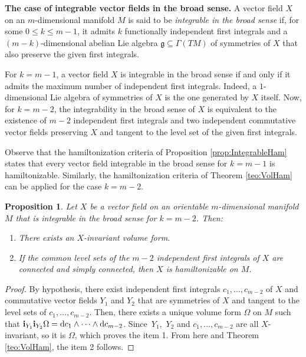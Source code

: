 \documentclass[pdftex]{sigma}%
\newcommand{\dd}{{\rm d}}
\newcommand{\ii}{\mathbf{i}}
\numberwithin{equation}{section}
\newtheorem{Proposition}[Theorem]{Proposition}
 { \theoremstyle{definition}
\newtheorem{Definition}[Theorem]{Definition}
\newtheorem{Note}[Theorem]{Note}
\newtheorem{Example}[Theorem]{Example}
\newtheorem{Remark}[Theorem]{Remark} }
\begin{document}
{\bf The case of integrable vector fields in the broad sense.} A vector field $X$ on an $m$-dimensional manifold $M$ is said to be \emph{integrable in the broad sense} \cite[Definition 1]{Bog98} if, for some $0\leq k\leq m-1$, it admits $k$ functionally independent first integrals and a $(m-k)$-dimensional abelian Lie algebra $\mathfrak{g} \subseteq \Gamma(TM)$ of symmetries of $X$ that also preserve the given first integrals.

For $k=m-1$, a vector field $X$ is integrable in the broad sense if and only if it admits the maximum number of independent first integrals. Indeed, a $1$-dimensional Lie algebra of symmetries of $X$ is the one generated by $X$ itself. Now, for $k=m-2$, the integrability in the broad sense of $X$ is equivalent to the existence of $m-2$ independent first integrals and two independent commutative vector fields preserving $X$ and tangent to the level set of the given first integrals.

Observe that the hamiltonization criteria of Proposition \ref{prop:IntegrableHam} states that every vector field integrable in the broad sense for $k=m-1$ is hamiltonizable. Similarly, the hamiltonization criteria of Theorem \ref{teo:VolHam} can be applied for the case $k=m-2$.

\begin{Proposition}
Let $X$ be a vector field on an orientable $m$-dimensional manifold $M$ that is integrable in the broad sense for $k=m-2$. Then:
 \begin{enumerate}\itemsep=0pt
 \item[$1.$] There exists an $X$-invariant volume form.
 \item[$2.$] If the common level sets of the $m-2$ independent first integrals of $X$ are connected and simply connected, then $X$ is hamiltonizable on $M$.
 \end{enumerate}
\end{Proposition}
{\sloppy\begin{proof}
By hypothesis, there exist independent first integrals $c_1,\dots,c_{m-2}$ of $X$ and commutative vector fields $Y_1$ and $Y_2$ that are symmetries of $X$ and tangent to the level sets of $c_1,\dots,c_{m-2}$. Then, there exists a unique volume form $\Omega$ on $M$ such that $\ii_{Y_1}\ii_{Y_2}\Omega = \dd c_1\wedge\cdots\wedge\dd c_{m-2}$. Since~$Y_1$,~$Y_2$ and $c_1,\dots,c_{m-2}$ are all $X$-invariant, so it is $\Omega$, which proves the item 1. From here and Theorem \ref{teo:VolHam}, the item 2 follows.
\end{proof}}
\end{document}
